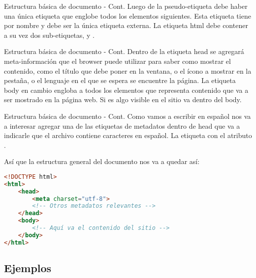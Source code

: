
\begin{frame}{Estructura básica de documento - Cont.}
	Luego de la pseudo-etiqueta debe haber una única etiqueta que englobe todos
	los elementos siguientes.
	\jump
	Esta etiqueta tiene por nombre  y debe ser la única etiqueta externa.
	\jump
	La etiqueta html debe contener a su vez dos sub-etiquetas,  y .
\end{frame}


\begin{frame}{Estructura básica de documento - Cont.}
	Dentro de la etiqueta head se agregará meta-información que el browser puede
	utilizar para saber como mostrar el contenido, como el título que debe poner
	en la ventana, o el ícono a mostrar en la pestaña, o el lenguaje en el que se
	espera se encuentre la página.
	\jump
	La etiqueta body en cambio engloba a todos los elementos que representa
	contenido que va a ser mostrado en la página web. Si es algo visible en el
	sitio va dentro del body.
\end{frame}


\begin{frame}[fragile]{Estructura básica de documento - Cont.}
	Como vamos a escribir en español nos va a interesar agregar una de las etiquetas
	de metadatos dentro de head que va a indicarle que el archivo contiene caracteres
	en español. La etiqueta  con el atributo .

	Así que la estructura general del documento nos va a quedar así:
	\begin{lstlisting}[language=HTML]
<!DOCTYPE html>
<html>
	<head>
		<meta charset="utf-8">
		<!-- Otros metadatos relevantes -->
	</head>
	<body>
		<!-- Aquí va el contenido del sitio -->
	</body>
</html>
	\end{lstlisting}
\end{frame}


\subsection{Ejemplos}

